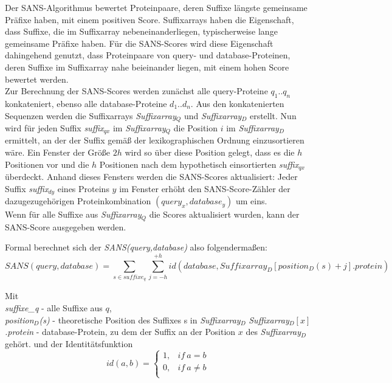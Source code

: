 \documentclass{article}
\begin{document}
Der SANS-Algorithmus bewertet Proteinpaare, deren Suffixe längste gemeinsame
Präfixe haben, mit einem positiven Score. Suffixarrays haben die Eigenschaft,
dass Suffixe, die im Suffixarray nebeneinanderliegen, typischerweise lange
gemeinsame Präfixe haben. Für die SANS-Scores wird diese Eigenschaft dahingehend
genutzt, dass Proteinpaare von query- und database-Proteinen, deren Suffixe im
Suffixarray nahe beieinander liegen, mit einem hohen Score bewertet werden.\\
Zur Berechnung der SANS-Scores werden zunächst alle query-Proteine $q_1..q_n$ konkateniert, ebenso alle database-Proteine $d_1..d_n$. 
Aus den konkatenierten Sequenzen werden die Suffixarrays \emph{Suffixarray$_Q$} und \emph{Suffixarray$_D$} erstellt. 
Nun wird für jeden Suffix \emph{suffix$_{qx}$} im \emph{Suffixarray$_Q$} die
Position $i$ im \emph{Suffixarray$_D$} ermittelt, an der der Suffix gemäß der lexikographischen Ordnung einzusortieren wäre. 
Ein Fenster der Größe $2h$ wird so über diese Position gelegt, dass es die $h$
Positionen vor und die $h$ Positionen nach dem hypothetisch einsortierten
\emph{suffix$_{qx}$} überdeckt. 
Anhand dieses Fensters werden die SANS-Scores aktualisiert: 
Jeder Suffix \emph{suffix$_{dy}$} eines Proteins $y$ im Fenster erhöht den SANS-Score-Zähler der dazugezugehörigen Proteinkombination $(query_x,database_y)$ um eins. \\
Wenn für alle Suffixe aus \emph{Suffixarray$_Q$} die Scores aktualisiert wurden, kann der SANS-Score ausgegeben werden.

Formal berechnet sich der \emph{SANS(query,database)} also folgendermaßen:\\

\begin{equation*}
SANS(query,database) = \sum_{s \in suffixe_q} \sum_{j=-h}^{+h} id(database,Suffixarray_D[position_D(s)  +j].protein) 
\end{equation*}

Mit\\
\emph{suffixe_q} - alle Suffixe aus $q$,\\
\emph{position$_D$(s)} - theoretische Position des Suffixes s in \emph{Suffixarray$_D$} 
\emph{Suffixarray$_D[x]$.protein} - database-Protein, zu dem der Suffix an der Position $x$ des \emph{Suffixarray$_D$} gehört. 
und der Identitätsfunktion\\

\begin{equation*}
id(a,b)=\begin{cases}
  1,  & if~a=b\\
  0,  & if~a\ne b\\
\end{cases}
\end{equation*}
\end{document}
